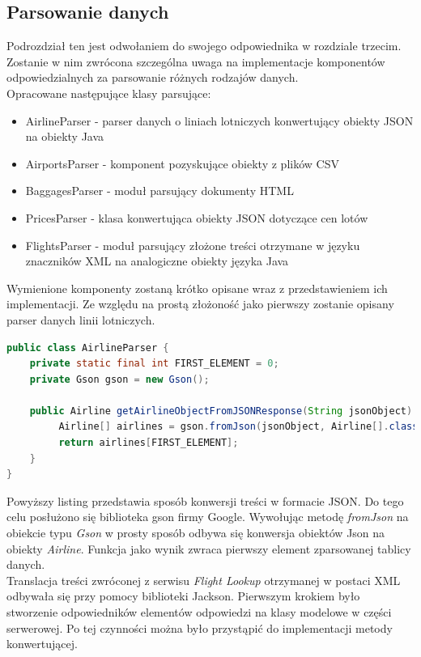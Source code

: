 \documentclass[12pt, twoside]{report}
\begin{document}
\subsection{Parsowanie danych}
Podrozdział ten jest odwołaniem do swojego odpowiednika w rozdziale trzecim. Zostanie w nim zwrócona szczególna uwaga na implementacje komponentów odpowiedzialnych za parsowanie różnych rodzajów danych.\\ \indent
	Opracowane następujące klasy parsujące:
	\begin{itemize}[noitemsep,topsep=0pt]
\item AirlineParser - parser danych o liniach lotniczych konwertujący obiekty JSON na obiekty Java
\item AirportsParser - komponent pozyskujące obiekty z plików CSV
\item BaggagesParser - moduł parsujący dokumenty HTML
\item PricesParser - klasa konwertująca obiekty JSON dotyczące cen lotów
\item FlightsParser - moduł parsujący złożone treści otrzymane w języku znaczników XML na analogiczne obiekty języka Java
\end{itemize}
Wymienione komponenty zostaną krótko opisane wraz z przedstawieniem ich implementacji.
Ze względu na prostą złożoność jako pierwszy zostanie opisany parser danych linii lotniczych.
\begin{lstlisting}[language=java, caption=Implementacja parsowania treści JSON]
public class AirlineParser {
    private static final int FIRST_ELEMENT = 0;
    private Gson gson = new Gson();

    public Airline getAirlineObjectFromJSONResponse(String jsonObject) {
         Airline[] airlines = gson.fromJson(jsonObject, Airline[].class);
         return airlines[FIRST_ELEMENT];
    }
}
\end{lstlisting}
Powyższy listing przedstawia sposób konwersji treści w formacie JSON. Do tego celu posłużono się biblioteka gson firmy Google. Wywołując metodę \textit{fromJson} na obiekcie typu \textit{Gson} w prosty sposób odbywa się konwersja obiektów Json na obiekty \textit{Airline}. Funkcja jako wynik zwraca pierwszy element zparsowanej tablicy danych.\\ \indent
Translacja treści zwróconej z serwisu \textit{Flight Lookup} otrzymanej w postaci XML odbywała się przy pomocy biblioteki Jackson. Pierwszym krokiem było stworzenie odpowiedników elementów odpowiedzi na klasy modelowe w części serwerowej. Po tej czynności można było przystąpić do implementacji metody konwertującej.
\end{document}
